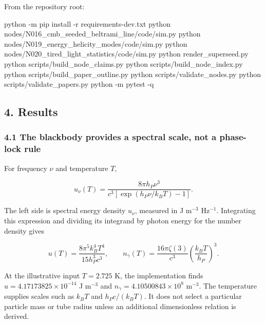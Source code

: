 \documentclass[
  11pt,
]{article}
\newenvironment{Shaded}{}{}
\newcommand{\AttributeTok}[1]{\textcolor[rgb]{0.49,0.56,0.16}{#1}}
\newcommand{\ExtensionTok}[1]{#1}
\newcommand{\NormalTok}[1]{#1}
\begin{document}
From the repository root:

\begin{Shaded}
\begin{Highlighting}[]
\ExtensionTok{python} \AttributeTok{{-}m}\NormalTok{ pip install }\AttributeTok{{-}r}\NormalTok{ requirements{-}dev.txt}
\ExtensionTok{python}\NormalTok{ nodes/N016\_cmb\_seeded\_beltrami\_line/code/sim.py}
\ExtensionTok{python}\NormalTok{ nodes/N019\_energy\_helicity\_modes/code/sim.py}
\ExtensionTok{python}\NormalTok{ nodes/N020\_tired\_light\_statistics/code/sim.py}
\ExtensionTok{python}\NormalTok{ render\_superseed.py}
\ExtensionTok{python}\NormalTok{ scripts/build\_node\_claims.py}
\ExtensionTok{python}\NormalTok{ scripts/build\_node\_index.py}
\ExtensionTok{python}\NormalTok{ scripts/build\_paper\_outline.py}
\ExtensionTok{python}\NormalTok{ scripts/validate\_nodes.py}
\ExtensionTok{python}\NormalTok{ scripts/validate\_papers.py}
\ExtensionTok{python} \AttributeTok{{-}m}\NormalTok{ pytest }\AttributeTok{{-}q}
\end{Highlighting}
\end{Shaded}

\hypertarget{results}{%
\subsection{4. Results}\label{results}}

\hypertarget{the-blackbody-provides-a-spectral-scale-not-a-phase-lock-rule}{%
\subsubsection{4.1 The blackbody provides a spectral scale, not a
phase-lock
rule}\label{the-blackbody-provides-a-spectral-scale-not-a-phase-lock-rule}}

For frequency \(\nu\) and temperature \(T\),

\[
u_\nu(T)=\frac{8\pi h_P\nu^3}{c^3[\exp(h_P\nu/k_BT)-1]}.
\]

The left side is spectral energy density \(u_\nu\), measured in J
m\(^{-3}\) Hz\(^{-1}\). Integrating this expression and dividing its
integrand by photon energy for the number density gives

\[
u(T)=\frac{8\pi^5 k_B^4T^4}{15h_P^3c^3},\qquad
n_\gamma(T)=\frac{16\pi\zeta(3)}{c^3}\left(\frac{k_BT}{h_P}\right)^3.
\]

At the illustrative input \(T=2.725\) K, the implementation finds
\(u=4.17173825\times10^{-14}\) J m\(^{-3}\) and
\(n_\gamma=4.10500843\times10^8\) m\(^{-3}\). The temperature supplies
scales such as \(k_BT\) and \(h_Pc/(k_BT)\). It does not select a
particular particle mass or tube radius unless an additional
dimensionless relation is derived.
\end{document}
